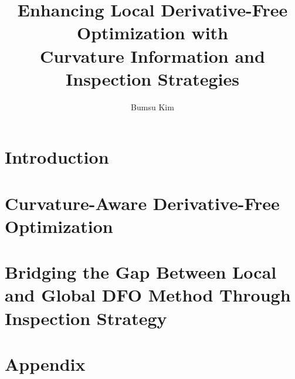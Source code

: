 \documentclass [PhD] {uclathes}
\title          {Enhancing Local Derivative-Free Optimization with\\ Curvature Information and Inspection Strategies}
\author         {Bumsu Kim}
\begin{document}
\makeintropages
%
%

\chapter{Introduction}



\chapter{Curvature-Aware Derivative-Free Optimization}


\chapter{Bridging the Gap Between Local and Global DFO Method Through Inspection Strategy}


\chapter{Appendix}


\end{document}
